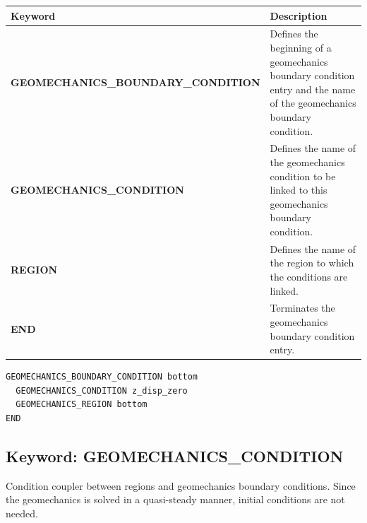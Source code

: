 \begin{center}
\begin{tabularx}{\linewidth}{lX}
\toprule[1.5pt]
\bf Keyword & \bf Description\\
\midrule
\bf GEOMECHANICS\_BOUNDARY\_CONDITION & Defines the beginning of a geomechanics boundary condition entry and the name of the geomechanics boundary condition.\\
\midrule
\bf GEOMECHANICS\_CONDITION & Defines the name of the geomechanics condition to be linked to this geomechanics boundary condition.\\
\midrule
\bf REGION & Defines the name of the region to which the conditions are linked.\\
\midrule
\bf END & Terminates the geomechanics boundary condition entry.\\
\bottomrule[1.5pt]
\end{tabularx}
\end{center}


\begin{mdframed}


\footnotesize

\begin{verbatim}
GEOMECHANICS_BOUNDARY_CONDITION bottom
  GEOMECHANICS_CONDITION z_disp_zero
  GEOMECHANICS_REGION bottom
END

\end{verbatim}
\normalsize
\end{mdframed}

\hyperlink{target_key}{\return}


\newpage
\protect\hypertarget{target_geomech_condition}{}
 
\subsection{Keyword: GEOMECHANICS\_CONDITION}

\hfill\hyperlink{target_key}{\return}

 Condition coupler between regions and geomechanics boundary conditions. Since the geomechanics is solved in a quasi-steady manner, initial conditions are not needed. 


